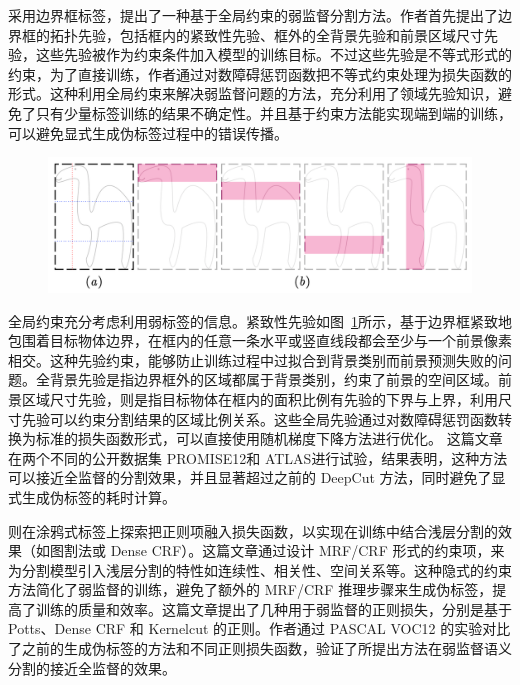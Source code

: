\citet{kervadec2020bounding} 采用边界框标签，提出了一种基于全局约束的弱监督分割方法。作者首先提出了边界框的拓扑先验，包括框内的紧致性先验、框外的全背景先验和前景区域尺寸先验，这些先验被作为约束条件加入模型的训练目标。不过这些先验是不等式形式的约束，为了直接训练，作者通过对数障碍惩罚函数把不等式约束处理为损失函数的形式。这种利用全局约束来解决弱监督问题的方法，充分利用了领域先验知识，避免了只有少量标签训练的结果不确定性。并且基于约束方法能实现端到端的训练，可以避免显式生成伪标签过程中的错误传播。
    \begin{figure}[tbp]
        \centering 
        \includegraphics[width=1.0\textwidth]{img/c2/rel_a6.png}
        \label{c2_fig6}
    \end{figure}
全局约束充分考虑利用弱标签的信息。紧致性先验如图~\ref{c2_fig6}所示，基于边界框紧致地包围着目标物体边界，在框内的任意一条水平或竖直线段都会至少与一个前景像素相交。这种先验约束，能够防止训练过程中过拟合到背景类别而前景预测失败的问题。全背景先验是指边界框外的区域都属于背景类别，约束了前景的空间区域。前景区域尺寸先验，则是指目标物体在框内的面积比例有先验的下界与上界，利用尺寸先验可以约束分割结果的区域比例关系。这些全局先验通过对数障碍惩罚函数转换为标准的损失函数形式，可以直接使用随机梯度下降方法进行优化。
这篇文章在两个不同的公开数据集 PROMISE12\citep{Litjens2014EvaluationOP}和 ATLAS\citep{Liew2018ALO}进行试验，结果表明，这种方法可以接近全监督的分割效果，并且显著超过之前的 DeepCut 方法，同时避免了显式生成伪标签的耗时计算。

\citet{tang2018regularized}则在涂鸦式标签上探索把正则项融入损失函数，以实现在训练中结合浅层分割的效果（如图割法或 Dense CRF）。这篇文章通过设计 MRF/CRF 形式的约束项，来为分割模型引入浅层分割的特性如连续性、相关性、空间关系等。这种隐式的约束方法简化了弱监督的训练，避免了额外的 MRF/CRF 推理步骤来生成伪标签，提高了训练的质量和效率。这篇文章提出了几种用于弱监督的正则损失，分别是基于 Potts、Dense CRF 和 Kernelcut 的正则。作者通过 PASCAL VOC12\citep{everingham2015pascal} 的实验对比了之前的生成伪标签的方法和不同正则损失函数，验证了所提出方法在弱监督语义分割的接近全监督的效果。



